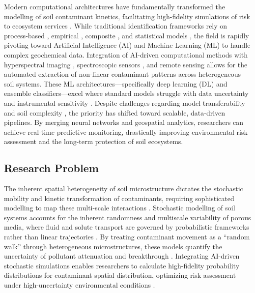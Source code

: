 \documentclass[preprint,12pt]{elsarticle}            %
\begin{document}
Modern computational architectures have fundamentally transformed the
modelling of soil contaminant kinetics, facilitating high-fidelity simulations
of risk to ecosystem services
\cite{Liu2020,Zhang2021,Proshad2025,Lemenkova2025d}. While traditional
identification frameworks rely on process-based
\cite{Giannakis2017,Karlen2019}, empirical \cite{Benavidez2018,Lal2020},
composite \cite{Sadhukhan2022}, and statistical models
\cite{Lu2020,Feng2024,Lemenkova2024b}, the field is rapidly pivoting toward
Artificial Intelligence (AI) and Machine Learning (ML) to handle complex
geochemical data. Integration of AI-driven computational methods
\cite{Proshad2025,Lemenkova2025d,Feng2024,Li2023} with hyperspectral imaging
\cite{Fan2025,Shi2021}, spectroscopic sensors \cite{Xu2026,Guo2025}, and
remote sensing \cite{Lemenkova2025b,Zhang2022} allows for the automated
extraction of non-linear contaminant patterns across heterogeneous soil
systems. These ML architectures---specifically deep learning (DL) and
ensemble classifiers---excel where standard models struggle with data
uncertainty \cite{Lu2020,Karlen2019,Li2023} and instrumental sensitivity
\cite{Rosskopfova2012}. Despite challenges regarding model transferability
\cite{Benavidez2018,Zhang2021} and soil complexity
\cite{Klaucol2017,Lemenkova2023b}, the priority has shifted toward scalable,
data-driven pipelines. By merging neural networks and geospatial analytics,
researchers can achieve real-time predictive monitoring, drastically improving
environmental risk assessment and the long-term protection of soil ecosystems.

\subsection{Research Problem}\label{sec1.2}

The inherent spatial heterogeneity of soil microstructure dictates the
stochastic mobility and kinetic transformation of contaminants, requiring
sophisticated modelling to map these multi-scale interactions
\cite{Vogel2018}. Stochastic modelling of soil systems accounts for the
inherent randomness and multiscale variability of porous media, where fluid
and solute transport are governed by probabilistic frameworks rather than
linear trajectories \cite{Vogel2018,Lemenkova2023}. By treating contaminant
movement as a ``random walk'' through heterogeneous microstructures, these
models quantify the uncertainty of pollutant attenuation and breakthrough
\cite{Lu2020,Karlen2019}. Integrating AI-driven stochastic simulations enables
researchers to calculate high-fidelity probability distributions for
contaminant spatial distribution, optimizing risk assessment under
high-uncertainty environmental conditions \cite{Li2023,Feng2024}.
\end{document}
